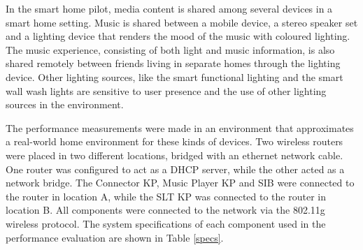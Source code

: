 

In the smart home pilot, media content is shared among several devices in a smart home setting. Music is shared between a mobile device, a stereo speaker set and a lighting device that renders the mood of the music with coloured lighting. The music experience, consisting of both light and music information, is also shared remotely between friends living in separate homes through the lighting device. Other lighting sources, like the smart functional lighting and the smart wall wash lights are sensitive to user presence and the use of other lighting sources in the environment.

 The performance measurements were made in an environment that approximates a real-world home environment for these kinds of devices. Two wireless routers were placed in two different locations, bridged with an ethernet network cable. One router was configured to act as a DHCP server, while the other acted as a network bridge. The Connector \ac{KP}, Music Player \ac{KP} and \ac{SIB} were connected to the router in location A, while the \ac{SLT} KP was connected to the router in location B. All components were connected to the network via the 802.11g wireless protocol. The system specifications of each component used in the performance evaluation are shown in Table \ref{specs}.


